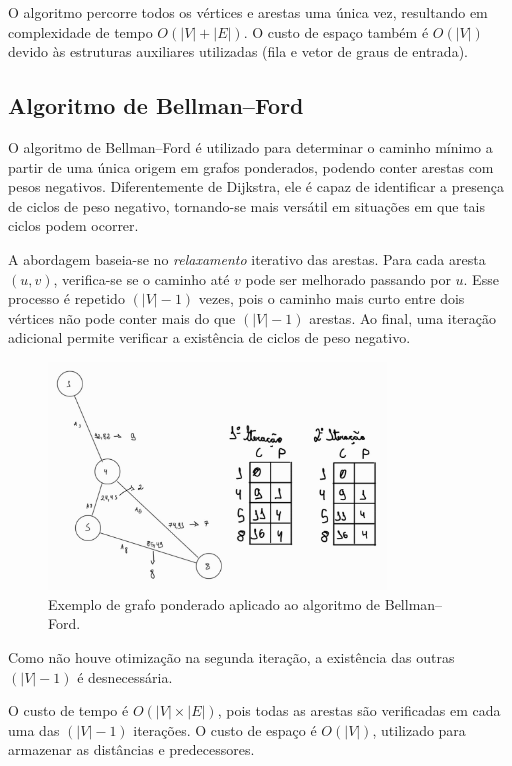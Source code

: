 O algoritmo percorre todos os vértices e arestas uma única vez, resultando em complexidade de tempo $O(|V| + |E|)$. O custo de espaço também é $O(|V|)$ devido às estruturas auxiliares utilizadas (fila e vetor de graus de entrada).

\newpage
\subsection{Algoritmo de Bellman–Ford}\label{sec:bellmanFord}

O algoritmo de Bellman–Ford é utilizado para determinar o caminho mínimo a partir de uma única origem em grafos ponderados, podendo conter arestas com pesos negativos. Diferentemente de Dijkstra, ele é capaz de identificar a presença de ciclos de peso negativo, tornando-se mais versátil em situações em que tais ciclos podem ocorrer.

A abordagem baseia-se no \textit{relaxamento} iterativo das arestas. Para cada aresta $(u, v)$, verifica-se se o caminho até $v$ pode ser melhorado passando por $u$. Esse processo é repetido $(|V| - 1)$ vezes, pois o caminho mais curto entre dois vértices não pode conter mais do que $(|V| - 1)$ arestas. Ao final, uma iteração adicional permite verificar a existência de ciclos de peso negativo.

\begin{figure}[H]
    \centering
    \includegraphics[width=0.8\textwidth]{figuras/ford.jpeg}
    \caption{Exemplo de grafo ponderado aplicado ao algoritmo de Bellman–Ford.}
    \label{fig:bellmanFord}
\end{figure}

Como não houve otimização na segunda iteração, a existência das outras $(|V| - 1)$ é desnecessária.

O custo de tempo é $O(|V| \times |E|)$, pois todas as arestas são verificadas em cada uma das $(|V| - 1)$ iterações. O custo de espaço é $O(|V|)$, utilizado para armazenar as distâncias e predecessores.

